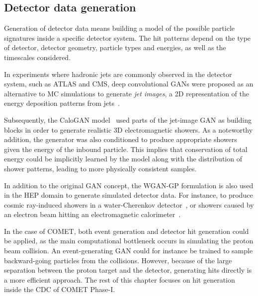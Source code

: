 \subsection{Detector data generation}
Generation of detector data means building a model of the possible particle
signatures inside a specific detector system. The hit patterns depend on the
type of detector, detector geometry, particle types and energies, as well as the
timescales considered.

In experiments where hadronic jets are commonly observed in the detector system,
such as ATLAS and CMS, deep convolutional GANs were proposed as an alternative
to MC simulations to generate \emph{jet images}, a 2D representation of the
energy deposition patterns from jets~\cite{deOliveira2017a}.

Subsequently, the {\sc CaloGAN} model~\cite{paganini_calogan_2018} used parts of
the jet-image GAN as building blocks in order to generate realistic 3D
electromagnetic showers. As a noteworthy addition, the generator was also
conditioned to produce appropriate showers given the energy of the inbound
particle. This implies that conservation of total energy could be implicitly
learned by the model along with the distribution of shower patterns, leading to
more physically consistent samples.


In addition to the original GAN concept, the WGAN-GP formulation is also used in
the HEP domain to generate simulated detector data. For instance, to produce
cosmic ray-induced showers in a water-Cherenkov detector~\cite{Erdmann2018}, or
showers caused by an electron beam hitting an electromagnetic
calorimeter~\cite{Erdmann2019}.

In the case of COMET, both event generation and detector hit generation could be
applied, as the main computational bottleneck occurs in simulating the proton
beam collision. An event-generating GAN could for instance be trained to sample
backward-going particles from the collisions. However, because of the large
separation between the proton target and the detector, generating hits directly
is a more efficient approach. The rest of this chapter focuses on hit
generation inside the CDC of COMET Phase-I.





